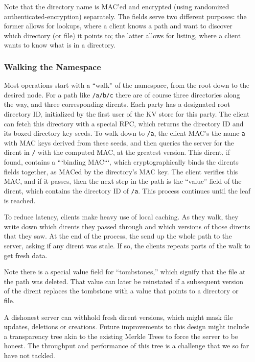 Note that the directory name is MAC'ed and encrypted (using randomized
authenticated-encryption) separately.  The fields serve two different purposes:
the former allows for lookups, where a client knows a path and want to discover
which directory (or file) it points to; the latter allows for listing,
where a client wants to know what is in a directory.

\subsubsection{Walking the Namespace}
\label{sec:walk}

Most operations start with a ``walk'' of the namespace, from the root down to the desired node.
For a path like \texttt{/a/b/c} there are of course three directories along the way,
and three corresponding dirents.  Each party has a designated root directory ID, initialized
by the first user of the KV store for this party. The client can fetch this directory 
with a special RPC, which returns the directory ID and its boxed directory key seeds.
To walk down to \texttt{/a}, the client MAC's the name \texttt{a} with MAC keys 
derived from these seeds, and then queries the server for the dirent in \texttt{/}
with the computed MAC, at the greatest version. This dirent, if found, contains a
```binding MAC```, which cryptographically binds the dirents fields together, as MACed
by the directory's MAC key. The client verifies this MAC, and if it passes, then the next
step in the path is the ``value'' field of the dirent, which contains the directory ID
of \texttt{/a}. This process continues until the leaf is reached.

To reduce latency, clients make heavy use of local caching. As they walk, they write down
which dirents they passed through and which versions of those dirents that they saw.
At the end of the process, the send up the whole path to the server, asking if any dirent
was stale. If so, the clients repeats parts of the walk to get fresh data. 

Note there is a special value field for ``tombstones,'' which signify that the 
file at the path was deleted. That value can later be reinstated if a subsequent version
of the dirent replaces the tombstone with a value that points to a directory or file.

A dishonest server can withhold fresh dirent versions, which might mask file
updates, deletions or creations. Future improvements to this design might
include a transparency tree akin to the existing Merkle Trees to force the
server to be honest. The throughput and performance of this tree is a challenge
that we so far have not tackled.

